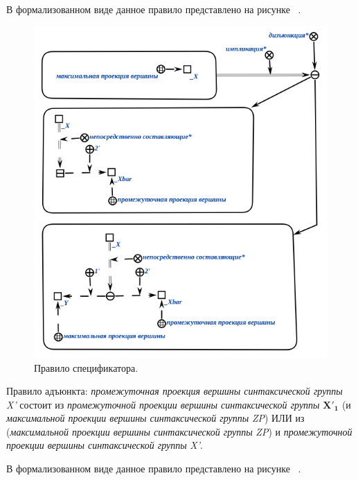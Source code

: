 В формализованном виде данное правило представлено на рисунке ~\textit{}.

\begin{figure}[h]
    \centering
    \includegraphics[scale=0.8]{images/part2/chapter_lang/specifier_rule}
    \caption{Правило спецификатора.}
    \label{fig:specifier_rule}
\end{figure}

Правило адъюнкта: \textit{промежуточная проекция вершины синтаксической группы} \textit{X'} состоит из \textit{промежуточной проекции вершины синтаксической группы} \textit{$\bm{X'_1}$} (и \textit{максимальной проекции вершины синтаксической группы} \textit{ZP}) ИЛИ из (\textit{максимальной проекции вершины синтаксической группы} \textit{ZP}) и \textit{промежуточной проекции вершины синтаксической группы} \textit{X'}.


В формализованном виде данное правило представлено на рисунке ~\textit{}.

